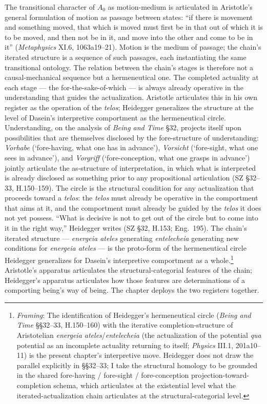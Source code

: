 The transitional character of $A_0$ as motion-medium is articulated in Aristotle's general formulation of motion as passage between states: ``if there is movement and something moved, that which is moved must first be in that out of which it is to be moved, and then not be in it, and move into the other and come to be in it'' (\textit{Metaphysics} XI.6, 1063a19--21). Motion is the medium of passage; the chain's iterated structure is a sequence of such passages, each instantiating the same transitional ontology. The relation between the chain's stages is therefore not a causal-mechanical sequence but a hermeneutical one. The completed actuality at each stage --- the for-the-sake-of-which --- is always already operative in the understanding that guides the actualization. Aristotle articulates this in his own register as the operation of the \textit{telos}; Heidegger generalizes the structure at the level of Dasein's interpretive comportment as the hermeneutical circle. Understanding, on the analysis of \textit{Being and Time} \S 32, projects itself upon possibilities that are themselves disclosed by the fore-structure of understanding: \textit{Vorhabe} (`fore-having, what one has in advance'), \textit{Vorsicht} (`fore-sight, what one sees in advance'), and \textit{Vorgriff} (`fore-conception, what one grasps in advance') jointly articulate the as-structure of interpretation, in which what is interpreted is already disclosed as something prior to any propositional articulation (SZ \S 32--33, H.150--159). The circle is the structural condition for any actualization that proceeds toward a \textit{telos}: the \textit{telos} must already be operative in the comportment that aims at it, and the comportment must already be guided by the \textit{telos} it does not yet possess. ``What is decisive is not to get out of the circle but to come into it in the right way,'' Heidegger writes (SZ \S 32, H.153; Eng.~195). The chain's iterated structure --- \textit{energeia ateles} generating \textit{entelecheia} generating new conditions for \textit{energeia ateles} --- is the proto-form of the hermeneutical circle Heidegger generalizes for Dasein's interpretive comportment as a whole.\footnote{\textit{Framing}: The identification of Heidegger's hermeneutical circle (\textit{Being and Time} §§32--33, H.150--160) with the iterative completion-structure of Aristotelian \textit{energeia ateles}/\textit{entelecheia} (the actualization of the potential \textit{qua} potential as an incomplete actuality returning to itself; \textit{Physics} III.1, 201a10--11) is the present chapter's interpretive move. Heidegger does not draw the parallel explicitly in §§32--33; I take the structural homology to be grounded in the shared fore-having / fore-sight / fore-conception projection-toward-completion schema, which articulates at the existential level what the iterated-actualization chain articulates at the structural-categorial level.} Aristotle's apparatus articulates the structural-categorial features of the chain; Heidegger's apparatus articulates how those features are determinations of a comporting being's way of being. The chapter deploys the two registers together.

